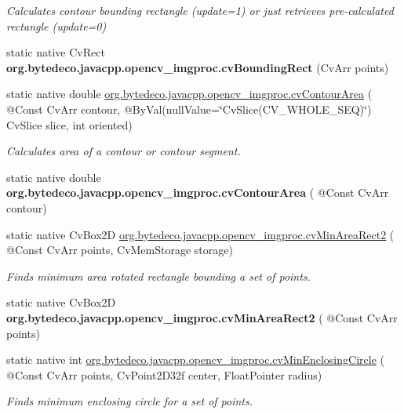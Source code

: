 \begin{DoxyCompactItemize}
\begin{DoxyCompactList}\small\item\em Calculates contour bounding rectangle (update=1) or just retrieves pre-\/calculated rectangle (update=0) \end{DoxyCompactList}\item 
\mbox{\label{group__imgproc__c_ga9822692d411b0d3e7151017d11a9804a}} 
static native Cv\+Rect {\bfseries org.\+bytedeco.\+javacpp.\+opencv\+\_\+imgproc.\+cv\+Bounding\+Rect} (Cv\+Arr points)
\item 
static native double \hyperlink{group__imgproc__c_gad23835119946d5ed21a357412881bb58}{org.\+bytedeco.\+javacpp.\+opencv\+\_\+imgproc.\+cv\+Contour\+Area} ( @Const Cv\+Arr contour, @By\+Val(null\+Value=\char`\"{}Cv\+Slice(C\+V\+\_\+\+W\+H\+O\+L\+E\+\_\+\+S\+EQ)\char`\"{}) Cv\+Slice slice, int oriented)
\begin{DoxyCompactList}\small\item\em Calculates area of a contour or contour segment. \end{DoxyCompactList}\item 
\mbox{\label{group__imgproc__c_gab15ff60e3aaa1ea40f6ac4b84c183be2}} 
static native double {\bfseries org.\+bytedeco.\+javacpp.\+opencv\+\_\+imgproc.\+cv\+Contour\+Area} ( @Const Cv\+Arr contour)
\item 
static native Cv\+Box2D \hyperlink{group__imgproc__c_ga4c0de18f88f591ddd8e7c21559b28813}{org.\+bytedeco.\+javacpp.\+opencv\+\_\+imgproc.\+cv\+Min\+Area\+Rect2} ( @Const Cv\+Arr points, Cv\+Mem\+Storage storage)
\begin{DoxyCompactList}\small\item\em Finds minimum area rotated rectangle bounding a set of points. \end{DoxyCompactList}\item 
\mbox{\label{group__imgproc__c_gad2b3141537abe3c44a75f2d37dad61aa}} 
static native Cv\+Box2D {\bfseries org.\+bytedeco.\+javacpp.\+opencv\+\_\+imgproc.\+cv\+Min\+Area\+Rect2} ( @Const Cv\+Arr points)
\item 
static native int \hyperlink{group__imgproc__c_ga20312fae33ba176dda93b108421e4fc7}{org.\+bytedeco.\+javacpp.\+opencv\+\_\+imgproc.\+cv\+Min\+Enclosing\+Circle} ( @Const Cv\+Arr points, Cv\+Point2\+D32f center, Float\+Pointer radius)
\begin{DoxyCompactList}\small\item\em Finds minimum enclosing circle for a set of points. \end{DoxyCompactList}\item 

\end{DoxyCompactItemize}
